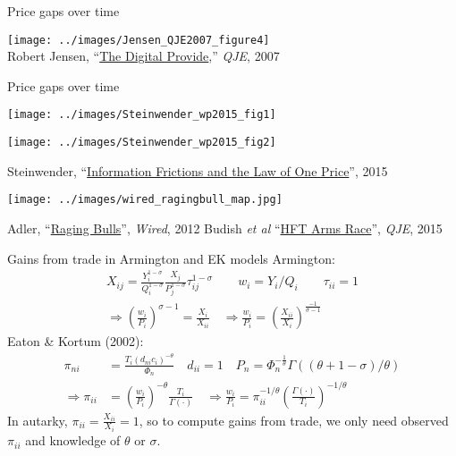 \documentclass[10pt,notes=hide]{beamer}
\begin{document}
\begin{frame}{Price gaps over time}
\begin{center}\texttt{[image: ../images/Jensen\_QJE2007\_figure4]} \\ \footnotesize{Robert Jensen, ``\href{http://qje.oxfordjournals.org/content/122/3/879.abstract}{The Digital Provide},'' \textit{QJE}, 2007}\end{center}
\end{frame}
\begin{frame}{Price gaps over time}
\begin{minipage}{.47\textwidth}\vspace{0pt}\texttt{[image: ../images/Steinwender\_wp2015\_fig1]}\end{minipage}
\begin{minipage}{.47\textwidth}\vspace{0pt}\texttt{[image: ../images/Steinwender\_wp2015\_fig2]}\end{minipage}
\begin{center}\footnotesize{Steinwender, ``\href{https://sites.google.com/site/clsteinwender/home/research}{Information Frictions and the Law of One Price}'', 2015} \end{center}
\texttt{[image: ../images/wired\_ragingbull\_map.jpg]}
\begin{center}\footnotesize{Adler, ``\href{https://www.wired.com/2012/08/ff_wallstreet_trading/}{Raging Bulls}'', \textit{Wired}, 2012} \hfill Budish \textit{et al} ``\href{https://faculty.chicagobooth.edu/eric.budish/research/HFT-FrequentBatchAuctions.pdf}{HFT Arms Race}'', \textit{QJE}, 2015 \end{center}
\end{frame}
\begin{frame}{Gains from trade in Armington and EK models}
Armington:
	\begin{align*}
	X_{ij}
	= \frac{Y_i^{1-\sigma}}{Q_i^{1-\sigma}} \frac{X_j}{P_j^{1-\sigma}}\tau_{ij}^{1-\sigma} 
	\qquad w_i =  Y_i / Q_i
	\qquad \tau_{ii}=1
	\\
	\Rightarrow
	\left(\frac{w_i}{P_i}\right)^{\sigma-1}
	=
	\frac{X_i}{X_{ii}}
	\quad 
	\Rightarrow
	\frac{w_i}{P_i} 
	=\left(\frac{X_{ii}}{X_i}\right)^{\frac{-1}{\sigma-1}}
	\end{align*}
Eaton \& Kortum (2002):
\begin{align*}
	\pi_{ni}
	&=
	\frac{T_{i}\left(d_{ni}c_{i}\right) ^{-\theta}}{\Phi_{n}}
	\quad d_{ii}=1
	\quad P_{n} = \Phi _{n}^{-\frac{1}{\theta }} \Gamma \left( \left({\theta +1-\sigma}\right) / {\theta}\right)
	\\
	\Rightarrow
	\pi_{ii}
	&= \left(\frac{w_i}{P_i}\right)^{-\theta} \frac{T_i}{\Gamma(\cdot)}
	\quad
	\Rightarrow
	\frac{w_i}{P_i}
	=
	\pi_{ii}^{-1/\theta} \left(\frac{\Gamma(\cdot)}{T_i}\right)^{-1/\theta}
\end{align*}
In autarky, $\pi_{ii} = \frac{X_{ii}}{X_i} = 1$,
so to compute gains from trade,
we only need observed $\pi_{ii}$ and knowledge of $\theta$ or $\sigma$.
\end{frame}
\end{document}
